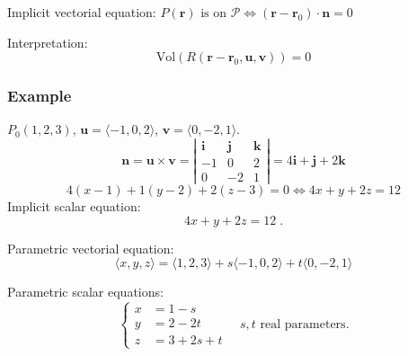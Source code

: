 \begin{frame}
{\alert<1->{Implicit vectorial equation}: $P(\textbf{r}) \text{ is on } \mathcal{P} \Longleftrightarrow (\textbf{r}-\textbf{r}_0) \cdot \textbf{n} = 0$

Interpretation:$$\text{Vol}(R(\textbf{r} - \textbf{r}_0,\textbf{u},\textbf{v})) = 0$$}
  
\vskip 10cm
\end{frame}


\begin{frame}
 \frametitle{Example}

$P_0(1,2,3)$, $\textbf{u}=\langle -1,0,2\rangle$, $\textbf{v} = \langle 0,-2,1\rangle$.\pause
%
$$\textbf{n} = \textbf{u} \times \textbf{v} = \left| \begin{array}{ccc}
                           \textbf{i} & \textbf{j} & \textbf{k} \\
			   -1 & 0 & 2 \\
                           0 & -2 & 1
                          \end{array}
\right| = 4\textbf{i}+\textbf{j} +2\textbf{k}$$
%
$$4(x-1)+1(y-2) + 2(z-3) = 0 \Longleftrightarrow 4x+y+2z = 12$$
%
\pause Implicit scalar equation:
%
$$4x+y+2z = 12\; .$$

\pause Parametric vectorial equation:
%
$$\langle x, y, z \rangle = \langle 1,2,3\rangle + s\langle -1, 0, 2\rangle + t\langle 0,-2,1\rangle$$

\pause Parametric scalar equations:
%
$$\left\{ \begin{array}{ll}
           x & = 1 -s \\
           y & = 2-2t \\
           z & = 3 +2s +t
          \end{array}
\right. \quad s,t \text{ real parameters}.$$
%
\end{frame}
